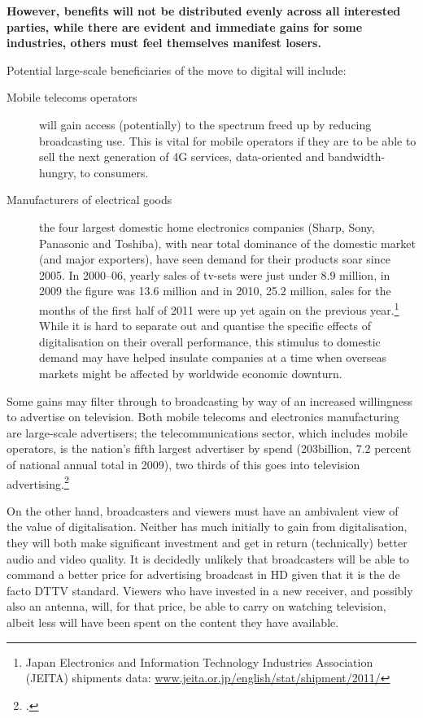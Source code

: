 \documentclass[11pt, oneside, a4paper, headsepline]{scrartcl}
\newcommand{\citej}[2] {\footcite[\nopp #1]{#2} }
\newcommand{\ty}{\textyen}
\begin{document}
\bigskip
{\bf 
However, benefits will not be distributed evenly across all interested parties, while there are evident and immediate gains for some industries, others must feel themselves manifest losers.

Potential large-scale beneficiaries of the move to digital will include: 
\begin{description}
\item [Mobile telecoms operators] will gain access (potentially) to the spectrum freed up by reducing broadcasting use. This is vital for mobile operators if they are to be able to sell the next generation of 4G services, data-oriented and bandwidth-hungry, to consumers.
\item [Manufacturers of electrical goods] the four largest domestic home electronics companies (Sharp, Sony, Panasonic and Toshiba), with near total dominance of the domestic market (and major exporters), have seen demand for their products soar since 2005. In 2000--06, yearly sales of tv-sets were just under 8.9 million, in 2009 the figure was 13.6 million and in 2010, 25.2 million, sales for the months of the first half of 2011 were up yet again on the previous year.\footnote{Japan Electronics and Information Technology Industries Association (JEITA) shipments data: \url{www.jeita.or.jp/english/stat/shipment/2011/}} While it is hard to separate out and quantise the specific effects of digitalisation on their overall performance, this stimulus to domestic demand may have helped insulate companies at a time when overseas markets might be affected by worldwide economic downturn.
\end{description}

Some gains may filter through to broadcasting by way of an increased willingness to advertise on television. Both mobile telecoms and electronics manufacturing are large-scale advertisers; the telecommunications sector, which includes mobile operators, is the nation's fifth largest advertiser by spend (\ty203billion, 7.2 percent of national annual total in 2009), two thirds of this goes into television advertising.\citej{202}{JMH:2011} %

\bigskip

On the other hand, broadcasters and viewers must have an ambivalent view of the value of digitalisation. Neither has much initially to gain from digitalisation, they will both make significant investment and get in return (technically) better audio and video quality. It is decidedly unlikely that broadcasters will be able to command a better price for advertising broadcast in HD given that it is the de facto DTTV standard. Viewers who have invested in a new receiver, and possibly also an antenna, will, for that price, be able to carry on watching television, albeit less will have been spent on the content they have available. 

}
\end{document}
